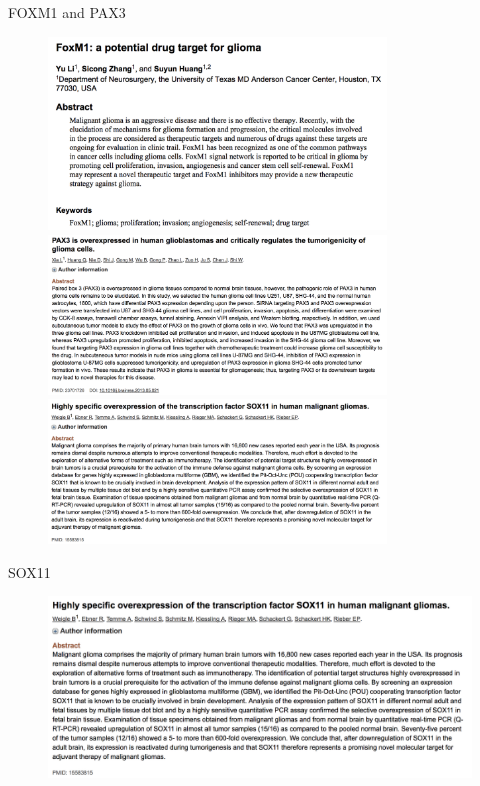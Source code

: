 \documentclass[slidestop,compress,11pt,xcolor=dvipsnames]{beamer}
\begin{document}
\begin{frame}{FOXM1 and PAX3}
\vspace{-0.5cm}
 \begin{figure}[ht!]
  \centering
  \includegraphics[width=0.8\textwidth]{glioma/paper_FOXM1.png}
  \includegraphics[width=0.8\textwidth]{glioma/paper_pax3.png}
  \includegraphics[width=0.8\textwidth]{glioma/paper_SOX11.png}
 \end{figure}
\end{frame}

\begin{frame}{SOX11}
\vspace{-0.5cm}
 \begin{figure}[ht!]
  \centering
  \includegraphics[width=1.0\textwidth]{glioma/paper_SOX11.png}
 \end{figure}
\end{frame}
\end{document}

